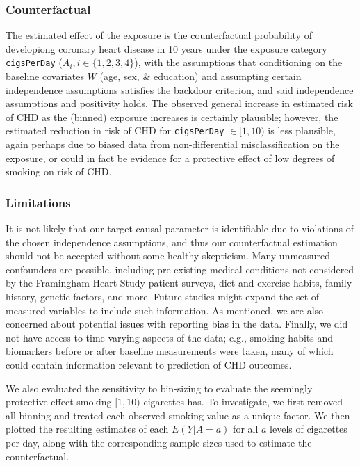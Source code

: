 \documentclass[]{article}
\begin{document}
\subsubsection{Counterfactual}\label{counterfactual}

The estimated effect of the exposure is the counterfactual probability
of developiong coronary heart disease in 10 years under the exposure
category \texttt{cigsPerDay} (\(A_i, i \in \{1, 2, 3, 4 \}\)), with the
assumptions that conditioning on the baseline covariates \(W\) (age,
sex, \& education) and assumpting certain independence assumptions
satisfies the backdoor criterion, and said independence assumptions and
positivity holds. The observed general increase in estimated risk of CHD
as the (binned) exposure increases is certainly plausible; however, the
estimated reduction in risk of CHD for \texttt{cigsPerDay}
\(\in [1, 10)\) is less plausible, again perhaps due to biased data from
non-differential misclassification on the exposure, or could in fact be
evidence for a protective effect of low degrees of smoking on risk of
CHD.

\subsubsection{Limitations}\label{limitations}

It is not likely that our target causal parameter is identifiable due to
violations of the chosen independence assumptions, and thus our
counterfactual estimation should not be accepted without some healthy
skepticism. Many unmeasured confounders are possible, including
pre-existing medical conditions not considered by the Framingham Heart
Study patient surveys, diet and exercise habits, family history, genetic
factors, and more. Future studies might expand the set of measured
variables to include such information. As mentioned, we are also
concerned about potential issues with reporting bias in the data.
Finally, we did not have access to time-varying aspects of the data;
e.g., smoking habits and biomarkers before or after baseline
measurements were taken, many of which could contain information
relevant to prediction of CHD outcomes.

We also evaluated the sensitivity to bin-sizing to evaluate the
seemingly protective effect smoking \([1, 10)\) cigarettes has. To
investigate, we first removed all binning and treated each observed
smoking value as a unique factor. We then plotted the resulting
estimates of each \(E(Y | A=a)\) for all \(a\) levels of cigarettes per
day, along with the corresponding sample sizes used to estimate the
counterfactual.
\end{document}

